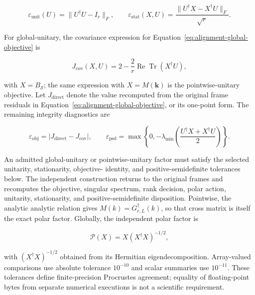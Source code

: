 \documentclass[11pt]{article}
\begin{document}
\begin{equation}
 \varepsilon_{\mathrm{unit}}(U)=\lVert U^\dagger U-I_r\rVert_F,
 \qquad
 \varepsilon_{\mathrm{stat}}(X,U)
 =\frac{\lVert U^\dagger X-X^\dagger U\rVert_F}{\sqrt r}.
 \label{eq:alignment-integrity-defects}
\end{equation}

For global-unitary, the covariance expression for Equation~\eqref{eq:alignment-global-objective}
is

\begin{equation}
 J_{\mathrm{cov}}(X,U)
 =2-\frac{2}{r}\operatorname{Re}\operatorname{Tr}(X^\dagger U),
 \label{eq:alignment-objective-covariance}
\end{equation}

with $X=B_{\mathcal S}$; the same expression with $X=M(\mathbf k)$ is the
pointwise-unitary objective. Let $J_{\mathrm{direct}}$ denote the value recomputed from the original frame
residuals in Equation~\eqref{eq:alignment-global-objective}, or its one-point form.
The remaining integrity diagnostics are

\begin{equation}
 \varepsilon_{\mathrm{obj}}
 =\left|J_{\mathrm{direct}}-J_{\mathrm{cov}}\right|,
 \qquad
 \varepsilon_{\mathrm{psd}}
 =\max\!\left\{0,-\lambda_{\min}\!\left(
 \frac{U^\dagger X+X^\dagger U}{2}
 \right)\right\}.
 \label{eq:alignment-objective-psd-defects}
\end{equation}

An admitted global-unitary or pointwise-unitary factor must satisfy the selected unitarity, stationarity, objective-
identity, and positive-semidefinite tolerances below. The independent construction returns to the original frames and recomputes the
objective, singular spectrum, rank decision, polar action, unitarity, stationarity, and
positive-semidefinite disposition. Pointwise, the analytic analytic relation gives
$M(k)=G_{r,L}^\dagger(k)$, so that cross matrix is itself the exact polar factor. Globally,
the independent polar factor is

\begin{equation}
 \mathcal P(X)=X(X^\dagger X)^{-1/2},
 \label{eq:independent-global-polar}
\end{equation}

with $(X^\dagger X)^{-1/2}$ obtained from its Hermitian eigendecomposition. Array-valued
comparisons use absolute tolerance $10^{-10}$ and scalar summaries use $10^{-11}$.
These tolerances define finite-precision Procrustes agreement; equality of floating-point
bytes from separate numerical executions is not a scientific requirement.
\end{document}

